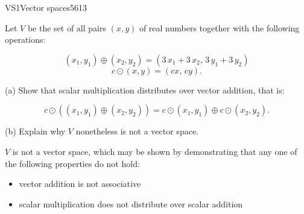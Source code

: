 \begin{exercise}{VS1}{Vector spaces}{5613} 
\begin{exerciseStatement} 

 Let \(V\) be the set of all pairs \((x,y)\) of real numbers together with the following operations: 

 \[(x_1,y_1)\oplus (x_2,y_2)=\left(3 \, x_{1} + 3 \, x_{2},\,3 \, y_{1} + 3 \, y_{2}\right)\]\[c \odot (x,y) =\left(c x,\,c y\right).\] 

 (a) Show that scalar multiplication distributes over vector addition, that is: 

 \[
      c\odot \left((x_1,y_1)\oplus(x_2,y_2)\right)=c\odot(x_1,y_1)\oplus c\odot(x_2,y_2).
    \] 

 (b) Explain why \(V\) nonetheless is not a vector space. 

 \end{exerciseStatement}
 \begin{exerciseAnswer} 

 \(V\) is not a vector space, which may be shown by demonstrating that any one of the following properties do not hold: 

 

\begin{itemize}
\item vector addition is not associative
\item scalar multiplication does not distribute over scalar addition
\end{itemize}

     \end{exerciseAnswer}
 \end{exercise}


